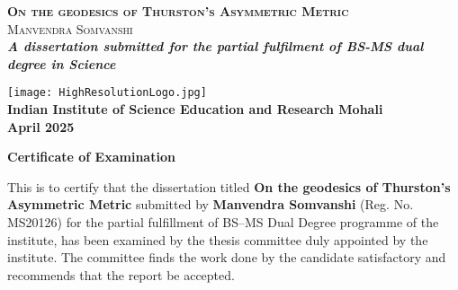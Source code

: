 \documentclass[a4paper, 12pt, twoside]{report}
\theoremstyle{plain}
\theoremstyle{definition}
\theoremstyle{remark}
\begin{document}
\date{}

\thispagestyle{empty}

\begin{titlepage}

\begin{center}
    \LARGE
    \textsc{\textbf{On the geodesics of Thurston's Asymmetric Metric}}\\
    \vspace{1cm}
    \Large
    \textsc{Manvendra Somvanshi}\\
    \vspace{1cm} 
    \large
    \textit{\textbf{A dissertation submitted for the partial fulfilment of
    BS-MS dual degree in Science}}\\
    \vspace{3.5cm}

    \texttt{[image: HighResolutionLogo.jpg]}\\

    \large
    \textbf{Indian Institute of Science Education and Research Mohali}\\

    \large
    \textbf{April 2025}\\

\end{center}


\end{titlepage}

\thispagestyle{empty}
\cleardoublepage


\begin{center}
    \textbf{\Large Certificate of Examination}
\end{center}

This is to certify that the dissertation titled \textbf{On the geodesics of Thurston's Asymmetric Metric} submitted by \textbf{Manvendra Somvanshi} (Reg. No. MS20126) for the partial fulfillment of BS--MS Dual Degree programme of the institute, has been examined by the thesis committee duly appointed by the institute. The committee finds the work done by the candidate satisfactory and recommends that the report be accepted.
\end{document}
